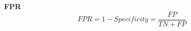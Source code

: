 \textbf{FPR} \\
\begin{equation*}
    FPR = 1- Specificity
        = \frac{FP}{TN+FP}
\end{equation*}














\setcounter{equation}{0}
\setcounter{table}{0}
\setcounter{figure}{0}
